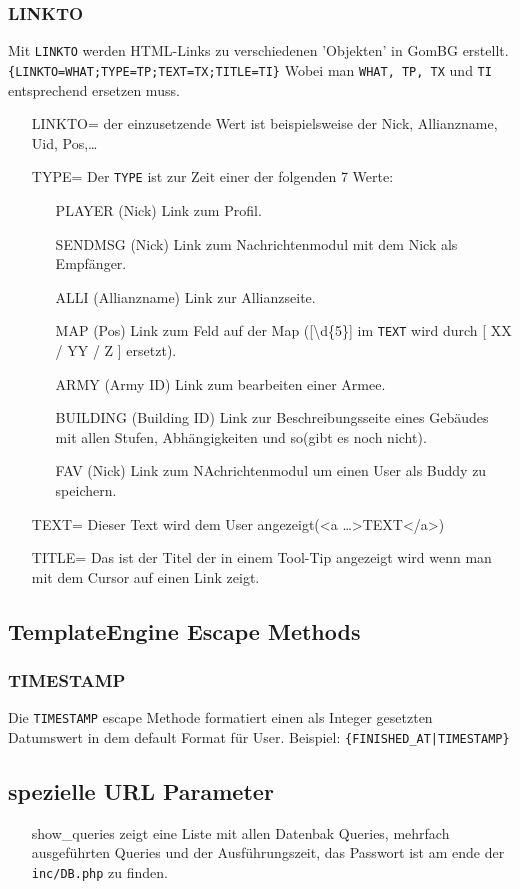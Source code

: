 \documentclass[a4paper,10pt]{article}
\begin{document}
\subsubsection{LINKTO}
Mit {\tt LINKTO} werden HTML-Links zu verschiedenen 'Objekten' in GomBG erstellt.\newline
{\tt \{LINKTO=WHAT;TYPE=TP;TEXT=TX;TITLE=TI\}}\newline
Wobei man {\tt WHAT, TP, TX} und {\tt TI} entsprechend ersetzen muss.
\begin{itemize}
	\item[LINKTO=] der einzusetzende Wert ist beispielsweise der Nick, Allianzname, Uid, Pos,\dots
	\item[TYPE=] Der {\tt TYPE} ist zur Zeit einer der folgenden 7 Werte:
	\begin{itemize}
		\item[PLAYER] (Nick) Link zum Profil.
		\item[SENDMSG] (Nick) Link zum Nachrichtenmodul mit dem Nick als Empf\"anger.
		\item[ALLI] (Allianzname) Link zur Allianzseite.
		\item[MAP] (Pos) Link zum Feld auf der Map ([\textbackslash d\{5\}] im {\tt TEXT} wird durch [ XX / YY / Z ] ersetzt).
		\item[ARMY] (Army ID) Link zum bearbeiten einer Armee.
		\item[BUILDING] (Building ID) Link zur Beschreibungsseite eines Geb\"audes mit allen Stufen, Abh\"angigkeiten und so(gibt es noch nicht).
		\item[FAV] (Nick) Link zum NAchrichtenmodul um einen User als Buddy zu speichern.
	\end{itemize}
	\item[TEXT=] Dieser Text wird dem User angezeigt({\textless}a \dots{\textgreater}TEXT{\textless}/a{\textgreater})
	\item[TITLE=] Das ist der Titel der in einem Tool-Tip angezeigt wird wenn man mit dem Cursor auf einen Link zeigt.
\end{itemize}

\subsection{TemplateEngine Escape Methods}

\subsubsection{TIMESTAMP}
Die {\tt TIMESTAMP} escape Methode formatiert einen als Integer gesetzten Datumswert in dem default Format f\"ur User.
Beispiel:\newline
{\tt \{FINISHED\_AT|TIMESTAMP\}}

\subsection{spezielle URL Parameter}

\begin{itemize}
  \item[show\_queries] zeigt eine Liste mit allen Datenbak Queries, mehrfach ausgef\"uhrten Queries und der Ausf\"uhrungszeit, das Passwort ist am ende der {\tt inc/DB.php} zu finden.
\end{itemize}
\end{document}
